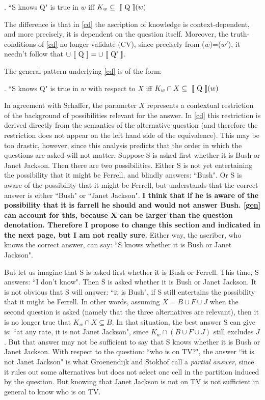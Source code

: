 \ex. \label{cf} ``S knows Q" is true in $w$ iff $K_{w} \subseteq
\mbox{ $[\![$ Q $]\!]$}(w)$

%

\noindent The difference is that in \ref{cd} the ascription of
knowledge is context-dependent, and more precisely, it is
dependent on the question itself. Moreover, the truth-conditions
of \ref{cd} no longer validate (CV), since precisely from
($w$)=($w'$), it needn't follow that
$\cup\mbox{ $[\![$ Q $]\!]$}=\cup\mbox{ $[\![$ Q' $]\!]$}$.

The general pattern underlying \ref{cd} is of the form:

\ex. \label{gen} ``S knows Q" is true in $w$ with respect to $X$
iff $K_w \cap X \subseteq \mbox{ $[\![$ Q $]\!]$}(w)$

In agreement with Schaffer, the parameter $X$ represents a
contextual restriction of the background of possibilities relevant
for the answer. In \ref{cd} this restriction is derived directly
from the semantics of the alternative question (and therefore the
restriction does not appear on the left hand side of the
equivalence). This may be too drastic, however, since this
analysis predicts that the order in which the questions are asked
will not matter. Suppose S is asked first whether it is Bush or
Janet Jackson. Then there are two possibilities. Either S is not
yet entertaining the possibility that it might be Ferrell, and
blindly answers: ``Bush". Or S is aware of the possibility that it
might be Ferrell, but understands that the correct answer is
either ``Bush" or ``Janet Jackson". {\bf I think that if he is aware of the possibility that it is farrell he should and would not answer Bush. \ref{gen} can account for this, because X can be larger than the question denotation. Therefore I propose to change this section and indicated in the next page, but I am not really sure. }  Either way, the ascriber, who
knows the correct answer, can say: ``S knows whether it is Bush or
Janet Jackson".

But let us imagine that S is asked first whether it is Bush or
Ferrell. This time, S answers: ``I don't know". Then S is asked
whether it is Bush or Janet Jackson. It is not obvious that S will
answer: ``it is Bush", if S still entertains the possibility that
it might be Ferrell. In other words, assuming $X=B\cup F\cup J$
when the second question is asked (namely that the three
alternatives are relevant), then it is no longer true that $K_w
\cap X \subseteq B$. In that situation, the best answer S can give
is: ``at any rate, it is not Janet Jackson", since $K_w \cap
(B\cup F\cup J)$ still excludes $J$. But that answer may not be
sufficient to say that S knows whether it is Bush or Janet
Jackson. With respect to the question: ``who is on TV?", the
answer ``it is not Janet Jackson" is what Groenendijk and Stokhof
call a \emph{partial answer}, since it rules out some alternatives but does not select one cell in
the partition induced by the question. But knowing that Janet
Jackson is not on TV is not sufficient in general to know who is
on TV.

